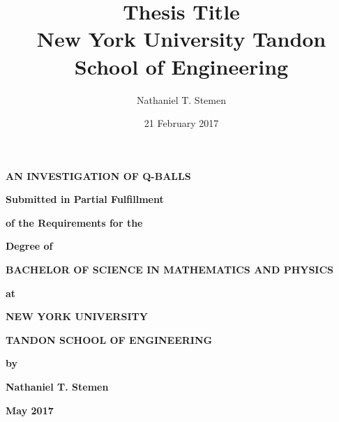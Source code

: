 \documentclass[12pt]{report}
\title{%
    {Thesis Title}\\
    {\large New York University Tandon School of Engineering}\\
}
\author{Nathaniel T. Stemen}
\date{21 February 2017}
\theoremstyle{definition}
\begin{document}
\begin{center}
\begin{minipage}{0.75\linewidth}
    \centering
    \textbf{\Large{AN INVESTIGATION OF Q-BALLS}} \\ \vspace{1.cm}

    \textbf{Submitted in Partial Fulfillment} \\ \vspace{0.5cm}

    \textbf{of the Requirements for the} \\ \vspace{0.5cm}

    \textbf{Degree of} \\ \vspace{0.75cm}

    \textbf{BACHELOR OF SCIENCE IN MATHEMATICS AND PHYSICS}\\ \vspace{0.75cm}

    \textbf{at} \\ \vspace{0.5cm}

    \textbf{NEW YORK UNIVERSITY} \\ \vspace{0.5cm}

    \textbf{TANDON SCHOOL OF ENGINEERING} \\ \vspace{0.5cm}

    \textbf{by} \\ \vspace{0.5cm}

    \textbf{Nathaniel T. Stemen} \\ \vspace{0.5cm}

    \textbf{May 2017}
\end{minipage}
\end{center}
\clearpage

\newpage
\pagestyle{plain}

\noindent
\end{document}
